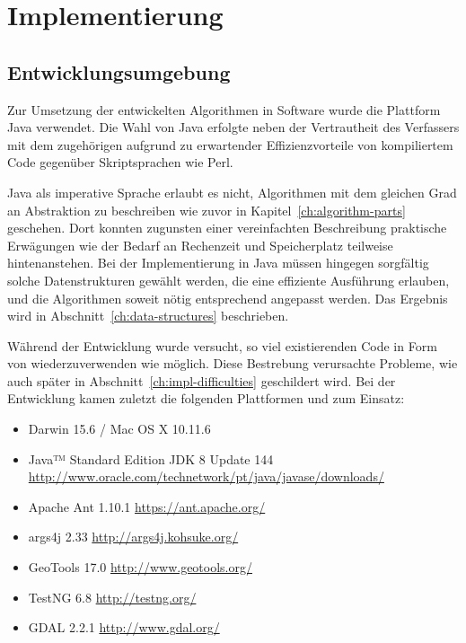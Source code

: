 \documentclass[../main/thesis.tex]{subfiles}
\begin{document}
\chapter{Implementierung}

\section{Entwicklungsumgebung}

Zur Umsetzung der entwickelten Algorithmen in Software wurde die Plattform Java verwendet.
Die Wahl von Java erfolgte neben der Vertrautheit des Verfassers mit dem zugehörigen  aufgrund zu erwartender Effizienzvorteile von kompiliertem Code gegenüber Skriptsprachen wie Perl.

Java als imperative Sprache erlaubt es nicht, Algorithmen mit dem gleichen Grad an Abstraktion zu beschreiben wie zuvor in Kapitel~\ref{ch:algorithm-parts} geschehen.
Dort konnten zugunsten einer vereinfachten
Beschreibung praktische Erwägungen wie der Bedarf an Rechenzeit und Speicherplatz teilweise hintenanstehen.
Bei der Implementierung in Java müssen hingegen sorgfältig solche Datenstrukturen gewählt werden, die eine effiziente Ausführung erlauben, und die Algorithmen soweit nötig entsprechend angepasst werden.
Das Ergebnis wird in Abschnitt~\ref{ch:data-structures} beschrieben.

Während der Entwicklung wurde versucht, so viel existierenden Code in Form von  wiederzuverwenden wie möglich.
Diese Bestrebung verursachte Probleme, wie auch später in Abschnitt~\ref{ch:impl-difficulties} geschildert wird.
Bei der Entwicklung kamen zuletzt die folgenden Plattformen und  zum Einsatz:

\begin{itemize}[nosep]
	\item Darwin 15.6 / Mac OS X 10.11.6
	\item Java™ Standard Edition JDK 8 Update 144\\ \url{http://www.oracle.com/technetwork/pt/java/javase/downloads/}
	\item Apache Ant 1.10.1 \quad \url{https://ant.apache.org/}
	\item args4j 2.33 \quad \url{http://args4j.kohsuke.org/}
	\item GeoTools 17.0 \quad \url{http://www.geotools.org/}
	\item TestNG 6.8 \quad \url{http://testng.org/}
	\item GDAL 2.2.1 \quad \url{http://www.gdal.org/}
\end{itemize}
\end{document}
